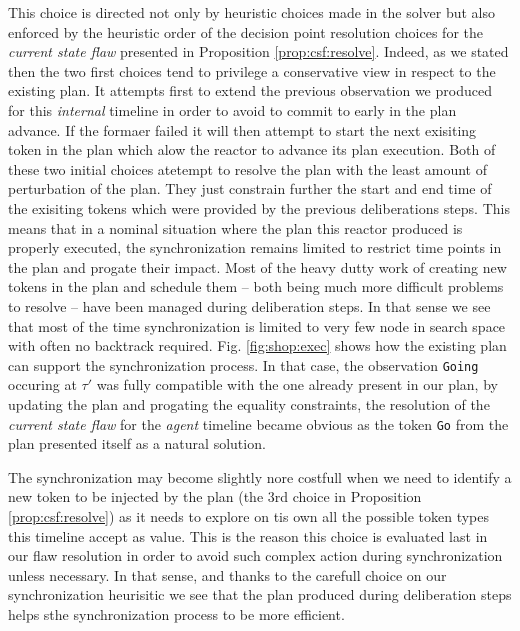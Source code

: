 This choice is directed not only by heuristic choices made in the
solver but also enforced by the heuristic order of the decision point
resolution choices for the {\em current  state flaw} presented in
Proposition \ref{prop:csf:resolve}. Indeed, as we stated then the two
first choices tend to privilege a conservative view in respect to the
existing plan. It attempts first to extend the previous observation we
produced for this {\em internal} timeline in order to avoid to commit
to early in the plan advance. If the formaer failed it will then
attempt to start the next exisiting token in the plan which alow the
reactor to advance its plan execution. Both of these two initial
choices atetempt to resolve the plan with the least amount of
perturbation of the plan. They just constrain further the start and
end time of the exisiting tokens which were provided by the previous 
deliberations steps. This means that in a nominal situation where the
plan this reactor produced is properly executed, the synchronization
remains limited to restrict time points in the plan and progate their
impact. Most of the heavy dutty work of creating new tokens in the
plan and schedule them -- both being much more difficult problems 
to resolve -- have been managed during deliberation steps. In that
sense we see that most of the time synchronization is limited to very
few node in \eu search space with often no backtrack required. 
Fig. \ref{fig:shop:exec} shows how the existing plan can support the
synchronization process. In that case, the observation \texttt{Going}
occuring at $\tau'$ was fully compatible with the one already present
in our plan, by updating the plan and progating the equality
constraints, the resolution of the {\em current state flaw} for the
{\em agent} timeline became obvious as the token \texttt{Go} from 
the plan presented itself as a natural solution.

The synchronization may become slightly nore costfull when we need to
identify a new token to be injected by the plan (the 3rd choice in
Proposition \ref{prop:csf:resolve}) as it needs to explore on tis own
all the possible token types this timeline accept as value. This is
the reason this choice is evaluated last in our flaw resolution in
order to avoid such complex action during synchronization unless 
necessary. In that sense,  and thanks to the carefull choice on our
synchronization heurisitic we see that the plan produced during \rx
deliberation steps helps sthe synchronization process to be more
efficient. 

